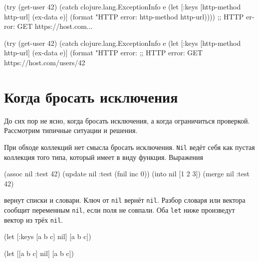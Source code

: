 \begin{english}
  \begin{clojure}
(try
  (get-user 42)
  (catch clojure.lang.ExceptionInfo e
    (let [{:keys [http-method http-url]}
          (ex-data e)]
      (format "HTTP error: %
        http-method http-url))))
;; HTTP error: GET https://host.com...
  \end{clojure}
\end{english}

\else

\begin{english}
  \begin{clojure}
(try
  (get-user 42)
  (catch clojure.lang.ExceptionInfo e
    (let [{:keys [http-method http-url]} (ex-data e)]
      (format "HTTP error: %
;; HTTP error: GET https://host.com/users/42
  \end{clojure}
\end{english}

\fi

\section{Когда бросать исключения}

До сих пор не ясно, когда бросать исключения, а когда ограничиться
проверкой. Рассмотрим типичные ситуации и решения.

При обходе коллекций нет смысла бросать исключения. \verb|Nil| ведёт себя как
пустая коллекция того типа, который имеет в виду функция. Выражения

\begin{english}
  \begin{clojure}
(assoc nil :test 42)
(update nil :test (fnil inc 0))
(into nil [1 2 3])
(merge nil {:test 42})
  \end{clojure}
\end{english}

\noindent
вернут списки и словари. Ключ от \verb|nil| вернёт \verb|nil|. Разбор
словаря или вектора сообщит переменным \verb|nil|, если поля не совпали. Оба
\verb|let| ниже произведут вектор из трёх \verb|nil|.

\ifx\devicetype\mobile

\begin{english}
  \begin{clojure}
(let [{:keys [a b c]} nil]
  [a b c])
  \end{clojure}

\splitter

  \begin{clojure}
(let [[a b c] nil]
  [a b c])
  \end{clojure}
\end{english}

